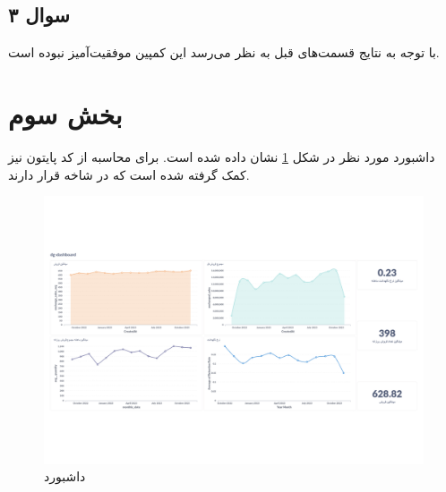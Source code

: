 \documentclass[a4paper,12pt,fullpage]{article}
\begin{document}
\subsection{سوال ۳}
با توجه به نتایج قسمت‌های قبل به نظر می‌رسد این کمپین موفقیت‌آمیز نبوده است.	

\section{بخش سوم}
داشبورد مورد نظر در شکل \ref{fig_dash} نشان داده شده است. برای محاسبه  از کد پایتون نیز کمک گرفته شده است که در شاخه  قرار دارند.

\begin{figure}[hbt!]
	\includegraphics[width=\linewidth]{"./images/dashboard.png"}
	\caption{داشبورد}
	\label{fig_dash}
\end{figure}
\end{document}
